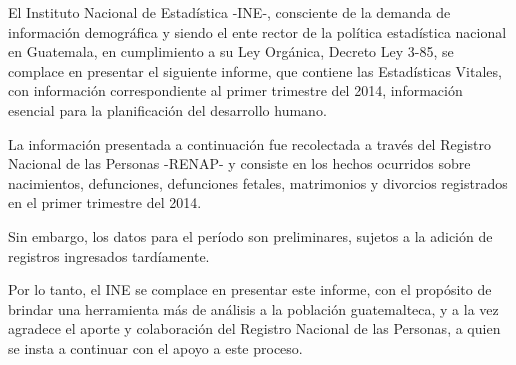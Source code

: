 $\ $\\



El Instituto Nacional de Estadística -INE-, consciente de la demanda de información demográfica y siendo el ente rector de la política estadística nacional en Guatemala, en cumplimiento a su Ley Orgánica, Decreto Ley 3-85, se complace en presentar el siguiente informe, que contiene las {\Bold Estadísticas Vitales}, con información correspondiente al {\Bold primer trimestre del 2014}, información esencial para la planificación del desarrollo humano.

La información presentada a continuación fue recolectada a través del Registro Nacional de las Personas  -RENAP- y consiste en los hechos ocurridos sobre nacimientos, defunciones, defunciones fetales, matrimonios y divorcios registrados en el primer trimestre del 2014. 

Sin embargo, los datos para el período {\Bold son preliminares}, sujetos a la adición de registros ingresados tardíamente.

Por lo tanto, el INE se complace en presentar este informe, con el propósito de brindar una herramienta más de análisis a la población guatemalteca, y a la vez agradece el aporte y colaboración del Registro Nacional de las Personas, a quien se insta  a continuar con el apoyo a este proceso.


\thispagestyle{empty}


\cleardoublepage
